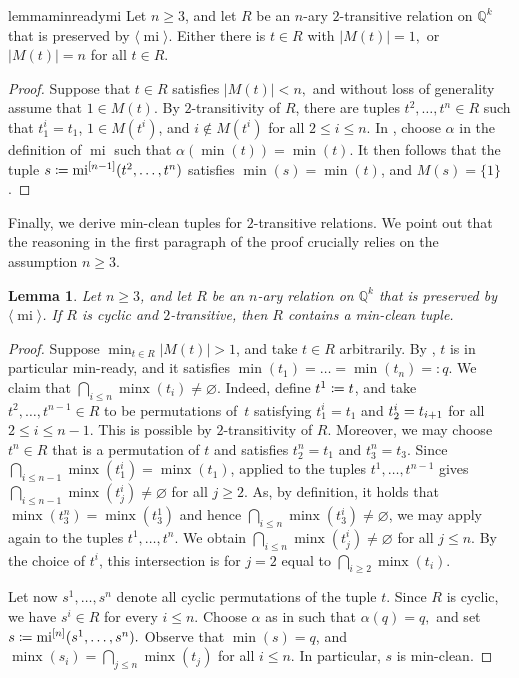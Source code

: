 \documentclass[a4paper,reqno, cleveref]{amsart}
\newcommand{\coloneqq}{\mathrel{\mathop:}\mathrel{\mkern-1.2mu}=}
\newtheorem{lemma}[theorem]{Lemma}
\newcommand{\Q}{\mathbb{Q}}
\DeclareMathOperator{\mi}{mi}
\DeclareMathOperator{\minx}{minx}
\newcommand{\nested}[2]{{#1^{[#2]}}}
\newcommand{\gen}[1]{\langle#1\rangle}
\newcommand\jo[1]{\textcolor{black}{#1}} %
\begin{document}
\begin{restatable}{lemma}{minreadymi}\label{l:minreadymi}
    Let $n \geq 3$, and let $R$ be an $n$-ary $2$-transitive relation on $\Q^k$ that is preserved by $\gen\mi$. Either there is $t \in R$ with $|M(t)|=1,$ or $|M(t)|=n$ for all $t \in R$.
\end{restatable}
\begin{proof}
    Suppose that $t\in R$ satisfies $|M(t)|<n,$ and without loss of generality assume that $1 \in M(t)$. 
    By $2$-transitivity of $R$, there are tuples $t^2,\dots,t^n\in R$ such that $t^i_1=t_1$, $1\in M(t^i)$, and $i\notin M(t^i)$ 
    for all $2\leq i \leq n$.
    In , choose $\alpha$ in the definition of $\mi$ such that $\alpha(\min(t))=\min(t).$ 
    It then follows that the tuple $s\coloneqq\nested{\mi}{n-1}(t^2,\dots, t^n)$  satisfies $\min(s)=\min(t)$, and $M(s)=\{1\}$.
\end{proof}


Finally, we derive min-clean tuples for $2$-transitive relations. We point out that the reasoning in the first paragraph of the proof crucially relies on  the assumption $n \geq 3$. 

\begin{lemma}\label{l:hypmi:minclean}
Let $n\geq 3$, and let $R$ be an $n$-ary  relation  on $\Q^k$ that is 
 preserved by $\gen\mi$. If $R$ is cyclic and $2$-transitive, then $R$ contains a min-clean tuple. 
  
\end{lemma}
\begin{proof}
    Suppose $\min_{t \in R}|M(t)| > 1 $, and take $t\in R$ arbitrarily. By , $t$ is in particular min-ready, and it satisfies  $\min(t_1)=\dots=\min(t_n)=:q$. We claim that $\bigcap_{i \leq n}\minx(t_i)\neq \varnothing.$ 
    Indeed,
    define $t^1\coloneqq t$, and take $t^2, \dots, t^{n-1}\in R$ to be permutations of~$t$ satisfying $t^i_1=t_1$ and $t^i_2=\jo{t_{i+1}}$ for all $2\leq i \leq n-1$. This is possible by $2$-transitivity of $R$. Moreover, we may choose $t^n\in R$ that is a permutation of $t$ and satisfies $t^n_2=t_1$ and $t^n_3=t_3$.   
    Since $\bigcap_{i \leq n-1}\minx(t_1^i)=\minx(t_1)$,   applied to the tuples $t^1, \dots, t^{n-1}$ 
    gives $\bigcap_{i\leq n-1}\minx(t^i_j)\neq \varnothing $ for all $j \geq 2$.  As, by definition, it holds that $\minx(t^n_3)=\minx(t^1_3)$ and hence $\bigcap_{i\leq n}\minx(t^i_3)\neq \varnothing$, we may apply  again to the tuples $t^1,\dots, t^n$. We obtain $\bigcap_{i\leq n}\minx(t^i_j)\neq \varnothing $ for all $j \leq n$.  By the choice of $t^i$,  this intersection is for $j=2$ equal to $\bigcap_{i \geq 2} \minx(t_i)$.  

    
   Let now $s^1, \dots, s^{n}$ denote all cyclic permutations of the tuple $t$. Since $R$ is cyclic, we have $s^i \in R$ for every $i \leq n$. Choose $\alpha$ as in  such that $\alpha(q)=q,$ and set  $s\coloneqq\nested{\mi}{n}(s^1, \dots, s^n).$ Observe that $\min(s)=q$, and $\minx(s_i)=\bigcap_{j\leq n}\minx(t_{j})$ for all $i\leq n$. In particular, $s$ is min-clean. 
\end{proof}
 
\end{document}
